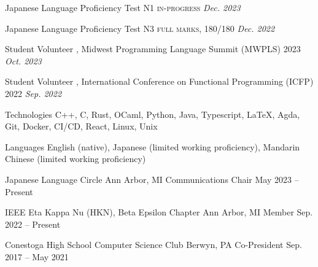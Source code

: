 \documentclass[letterpaper,11pt]{article}
\begin{document}
  \begin{rsectionlist}
    \rsectionitemthin
      {Japanese Language Proficiency Test N1}
      { \textsc{in-progress}}
      {\textit{\small Dec. 2023}}

    \vspace*{-1em}
    \rsectionitemthin
      {Japanese Language Proficiency Test N3}
      { \textsc{full marks, 180/180}}
      {\textit{\small Dec. 2022}}
  \end{rsectionlist}

  \begin{rsectionlist}
    \rsectionitemthin
      {Student Volunteer}
      {, Midwest Programming Language Summit (MWPLS) 2023}
      {\textit{\small Oct. 2023}}

    \vspace*{-1em}
    \rsectionitemthin
      {Student Volunteer}
      {, International Conference on Functional Programming (ICFP) 2022}
      {\textit{\small Sep. 2022}}
  \end{rsectionlist}

  \begin{rlinelist}
    \rline
      {Technologies}
      {C++, C, Rust, OCaml, Python, Java, Typescript, \LaTeX, Agda,
      Git, Docker, CI/CD, React, Linux, Unix}
      
    \rline
      {Languages}
      {English (native), Japanese (limited working proficiency), Mandarin Chinese (limited working proficiency)}
  \end{rlinelist}

  \begin{rsectionlist}
    \rsectionitem
      {Japanese Language Circle}
      {Ann Arbor, MI}
      {Communications Chair}
      {May 2023 -- Present}


    \rsectionitem
      {IEEE Eta Kappa Nu (HKN), Beta Epsilon Chapter}
      {Ann Arbor, MI}
      {Member}
      {Sep. 2022 -- Present}

    
    \rsectionitem
      {Conestoga High School Computer Science Club}
      {Berwyn, PA}
      {Co-President}
      {Sep. 2017 -- May 2021}

  \end{rsectionlist}
\end{document}
